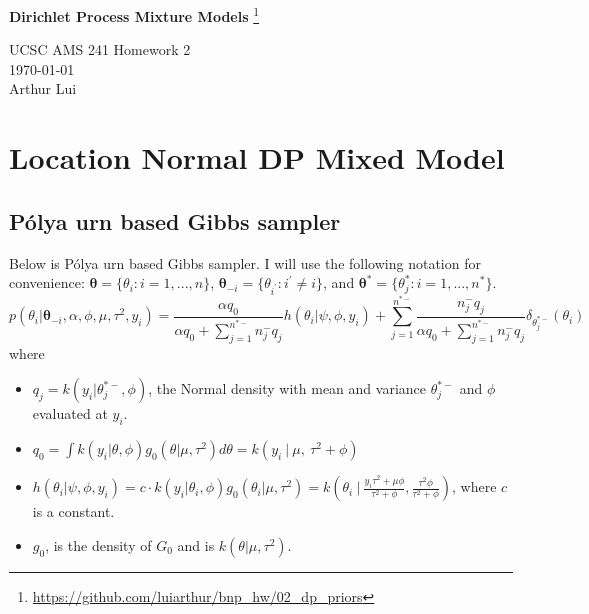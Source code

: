 \documentclass{article}
\def\wl{\par \vspace{\baselineskip}\noindent}
\def\ds{\displaystyle}
\def\tu{\textunderscore}
\def\hline{ \textcolor{lgrey}{\hrulefill} }
\newcommand{\m}[1]{\mathbf{\bm{#1}}} %
\def \ip{{i^\prime}}
\def \tmi{ \{ \theta_\ip : \ip \neq i\} }
\def \stmi{ \m{\theta}_{-i} }
\def \tv{ \{ \theta_i : i = 1,...,n\} }
\def \stv{ \m{\theta} }
\def \tu{ \{ \theta_j^* : i = 1,...,n^*\} }
\def \stu{ \m{\theta^*} }
\begin{document}
\begin{center}
  {\huge \textbf{Dirichlet Process Mixture Models}
    \footnote{\url{https://github.com/luiarthur/bnp_hw/02_dp_priors}}
  }\\
  \wl
  UCSC AMS 241 Homework 2\\
  \noindent\today\\
  Arthur Lui\\
  \hline
\end{center}

\section{Location Normal DP Mixed Model}
\subsection{P\'olya urn based Gibbs sampler}
\def\denom{ \alpha q_0 + \sum_{j=1}^{n^{*-}}n_j^- q_j }
Below is P\'olya urn based Gibbs sampler.
I will use the following notation for convenience: $\stv = \tv$, $\stmi = \tmi$, and $\stu = \tu$.
\[
    p(\theta_i | \stmi, \alpha, \phi, \mu, \tau^2, y_i) = 
    \ds\frac{\alpha q_0}{\denom} h(\theta_i| \psi, \phi, y_i) + 
    \ds\sum_{j=1}^{n^{*-}}\frac{ n_j^- q_j }{\denom} \delta_{\theta_j^{*-}}(\theta_i)
\]
where 
\begin{itemize}
  \item $q_j = k(y_i | \theta_j^{*-},\phi)$, the Normal density with mean and variance $\theta_j^{*-}$ and $\phi$ 
    evaluated at $y_i$.
  \item $q_0 = \ds\int k(y_i | \theta, \phi) g_0(\theta | \mu, \tau^2) d\theta
    = k(y_i~|~\mu,~\tau^2 + \phi)$
  \item $h(\theta_i| \psi, \phi, y_i) = c \cdot k(y_i | \theta_i, \phi) g_0(\theta_i | \mu, \tau^2)
    = k\left(\theta_i~\biggr|~\ds \frac{y_i\tau^2 + \mu\phi}{\tau^2+\phi},
    \ds\frac{\tau^2\phi}{\tau^2 + \phi} \right)$, where $c$ is a constant.
  \item $g_0$, is the density of $G_0$ and is $k(\theta | \mu, \tau^2)$.
\end{itemize}
\end{document}
